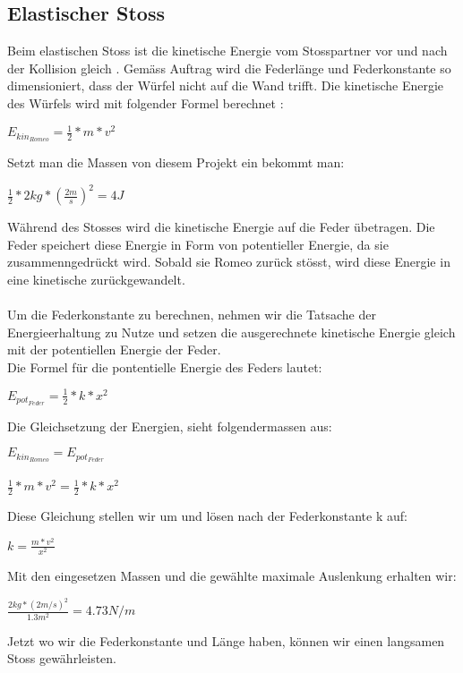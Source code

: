 \documentclass[../main.tex]{subfiles}
\begin{document}
\subsection{Elastischer Stoss}
Beim elastischen Stoss ist die kinetische Energie vom Stosspartner vor und nach der Kollision gleich \cite{tiplerpaula.PhysikFurStudierende}. Gemäss Auftrag wird die Federlänge und Federkonstante so dimensioniert, dass der Würfel nicht auf die Wand trifft.
Die kinetische Energie des Würfels wird mit folgender Formel berechnet \cite{tiplerpaula.PhysikFurStudierende}:
\begin{mdframed}
$E_{kin_{Romeo}}=\frac{1}{2} * m * v^{2}$
\end{mdframed}
Setzt man die Massen von diesem Projekt ein bekommt man:
\begin{mdframed}
$\frac{1}{2} * 2kg * (\frac{2m}{s})^{2} = 4J$
\end{mdframed}
Während des Stosses wird die kinetische Energie auf die Feder übetragen. Die Feder speichert diese Energie in Form von potentieller Energie, da sie zusammenngedrückt wird. Sobald sie Romeo zurück stösst, wird diese Energie in eine kinetische zurückgewandelt.\\\\
Um die Federkonstante zu berechnen, nehmen wir die Tatsache der Energieerhaltung zu Nutze und setzen die ausgerechnete kinetische Energie gleich mit der potentiellen Energie der Feder.\\
Die Formel für die pontentielle Energie des Feders lautet\cite{tiplerpaula.PhysikFurStudierende}:
\begin{mdframed}
$E_{pot_{Feder}}=\frac{1}{2} * k * x^{2}$
\end{mdframed}
Die Gleichsetzung der Energien, sieht folgendermassen aus\cite{tiplerpaula.PhysikFurStudierende}:
\begin{mdframed}
$E_{kin_{Romeo}}=E_{pot_{Feder}}$\\\\
$\frac{1}{2} * m * v^{2} = \frac{1}{2} * k * x^{2}$
\end{mdframed}
Diese Gleichung stellen wir um und lösen nach der Federkonstante k auf:
\begin{mdframed}
$ k=\frac{m * v^{2}}{x^{2}}$
\end{mdframed}
Mit den eingesetzen Massen und die gewählte maximale Auslenkung erhalten wir:
\begin{mdframed}
$\frac{2kg*(2m/s)^{2}}{1.3m^{2}} = 4.73N/m$
\end{mdframed}
Jetzt wo wir die Federkonstante und Länge haben, können wir einen langsamen Stoss gewährleisten.
\newpage
\end{document}
